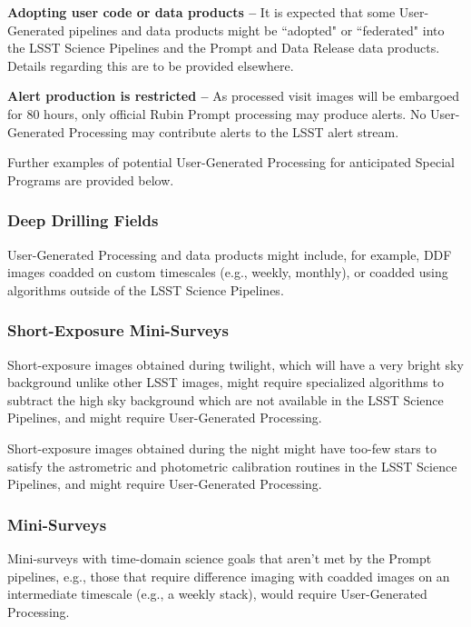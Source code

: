 \textbf{Adopting user code or data products --}
It is expected that some User-Generated pipelines and data products 
might be ``adopted" or ``federated" into the LSST Science Pipelines and the Prompt 
and Data Release data products.
Details regarding this are to be provided elsewhere.

\textbf{Alert production is restricted -- }
As processed visit images will be embargoed for 80 hours,
only official Rubin Prompt processing may produce alerts.
No User-Generated Processing may contribute alerts to the LSST alert stream.

Further examples of potential User-Generated Processing for anticipated Special Programs are provided below.

\subsubsection{Deep Drilling Fields}

User-Generated Processing and data products might include, for example, DDF images coadded 
on custom timescales (e.g., weekly, monthly), or coadded using algorithms outside of the 
LSST Science Pipelines.

\subsubsection{Short-Exposure Mini-Surveys}

Short-exposure images obtained during twilight, which will have a very bright sky 
background unlike other LSST images, might require specialized algorithms
to subtract the high sky background which are not available in the LSST Science Pipelines,
and might require User-Generated Processing.

Short-exposure images obtained during the night might have too-few stars to satisfy the
astrometric and photometric calibration routines in the LSST Science Pipelines,
and might require User-Generated Processing.

\subsubsection{Mini-Surveys}

Mini-surveys with time-domain science goals that aren't met by the Prompt pipelines, 
e.g., those that require difference imaging with coadded images on an intermediate 
timescale (e.g., a weekly stack), would require User-Generated Processing.
